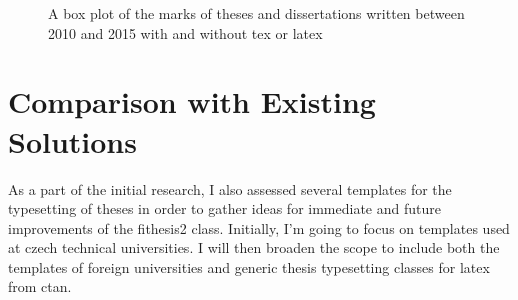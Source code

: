     \begin{figure}
      \centering
      \caption{A box plot of the marks of theses and dissertations written between 2010 and 2015 with and without \gls{tex} or \gls{latex}}
      \label{boxplot:statistics-marks}
    \end{figure}
    
    \section{Comparison with Existing Solutions}
    As a part of the initial research, I also assessed several templates for the typesetting of theses in order to gather ideas for immediate and future improvements of the fithesis2 class. Initially, I'm going to focus on templates used at czech technical universities. I will then broaden the scope to include both the templates of foreign universities and generic thesis typesetting classes for \gls{latex} from \gls{ctan}.

